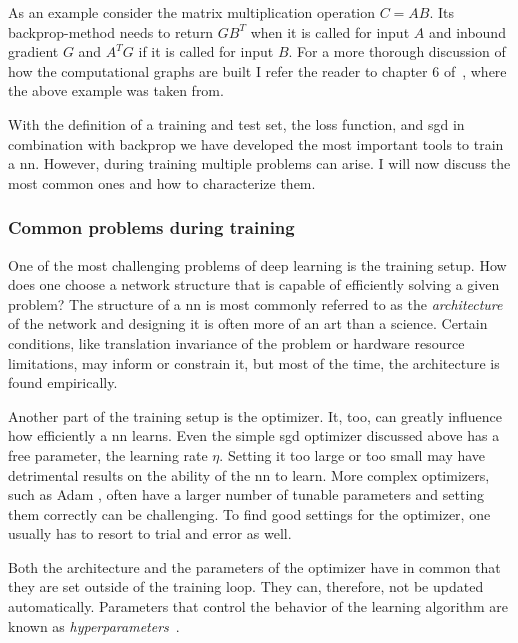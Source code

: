 As an example consider the matrix multiplication operation $C=AB$. Its backprop-method needs to return $GB^T$ when it is called for input $A$ and inbound gradient $G$ and $A^TG$ if it is called for input $B$. For a more thorough discussion of how the computational graphs are built I refer the reader to chapter 6 of~\cite{Goodfellow:2016:DNN}, where the above example was taken from.

With the definition of a training and test set, the loss function, and \acrshort{sgd} in combination with backprop we have developed the most important tools to train a \acrshort{nn}. However, during training multiple problems can arise. I will now discuss the most common ones and how to characterize them.

\subsubsection{Common problems during training}
One of the most challenging problems of deep learning is the training setup. How does one choose a network structure that is capable of efficiently solving a given problem? The structure of a \acrshort{nn} is most commonly referred to as the \emph{architecture} of the network and designing it is often more of an art than a science. Certain conditions, like translation invariance of the problem or hardware resource limitations, may inform or constrain it, but most of the time, the architecture is found empirically.

Another part of the training setup is the optimizer. It, too, can greatly influence how efficiently a \acrshort{nn} learns. Even the simple \acrshort{sgd} optimizer discussed above has a free parameter, the learning rate $\eta$. Setting it too large or too small may have detrimental results on the ability of the \acrshort{nn} to learn. More complex optimizers, such as Adam \cite{Kingma:2014aaa}, often have a larger number of tunable parameters and setting them correctly can be challenging. To find good settings for the optimizer, one usually has to resort to trial and error as well.

Both the architecture and the parameters of the optimizer have in common that they are set outside of the training loop. They can, therefore, not be updated automatically. Parameters that control the behavior of the learning algorithm are known as \emph{hyperparameters}~\cite{Goodfellow:2016:DNN}.


